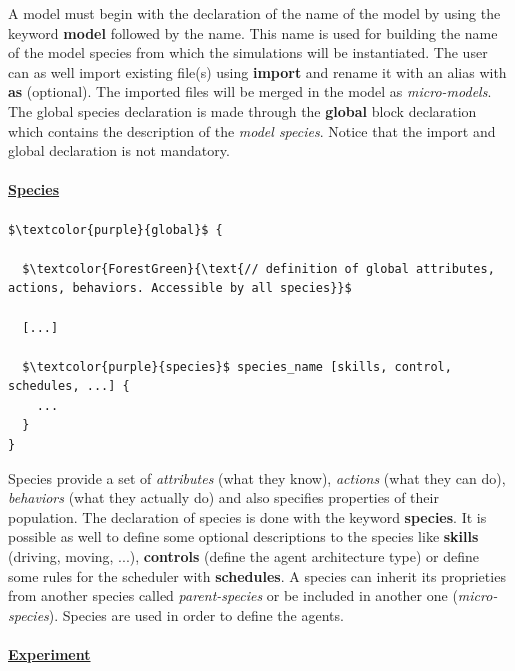 \documentclass[12pt, a4paper]{memoir} %
\begin{document}
				A model must begin with the declaration of the name of the model by using the keyword \textbf{model} followed by the name.
				This name is used for building the name of the model species from which the simulations will be instantiated.
				The user can as well import existing file(s) using \textbf{import} and rename it with an alias with \textbf{as} (optional).
				The imported files will be merged in the model as \textit{micro-models}. The global species declaration is made through
				the \textbf{global} block declaration which contains the description of the \textit{model species}. Notice that the import
				and global declaration is not mandatory.

				\paragraph{}
				\underline{\textbf{Species}}
				\paragraph{}

				\begin{lstlisting}[mathescape,caption=Species declaration.,label=code:species]
$\textcolor{purple}{global}$ {

  $\textcolor{ForestGreen}{\text{// definition of global attributes, actions, behaviors. Accessible by all species}}$

  [...]

  $\textcolor{purple}{species}$ species_name [skills, control, schedules, ...] {
    ...
  }
}
				\end{lstlisting}

				Species provide a set of \textit{attributes} (what they know), \textit{actions} (what they can do),
				\textit{behaviors} (what they actually do) and also specifies properties of their population.
				The declaration of species is done with the keyword \textbf{species}. It is possible as well to define some optional
				descriptions to the species like \textbf{skills} (driving, moving, ...), \textbf{controls} (define the agent architecture type) or
				define some rules for the scheduler with \textbf{schedules}. A species can inherit its proprieties from another species called
				\textit{parent-species} or be included in another one (\textit{micro-species}). Species are used in order to define the agents.

				\paragraph{}
				\underline{\textbf{Experiment}}
\end{document}
